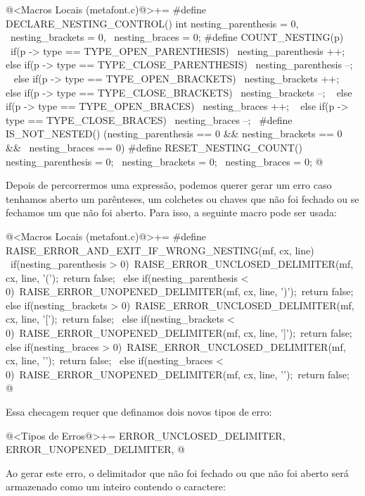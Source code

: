 \iniciocodigo
@<Macros Locais (metafont.c)@>+=
#define DECLARE_NESTING_CONTROL() int nesting_parenthesis = 0, \
                                      nesting_brackets = 0, \
                                      nesting_braces = 0;
#define COUNT_NESTING(p) \
  {if(p -> type == TYPE_OPEN_PARENTHESIS){         \
    nesting_parenthesis ++;                       \
  } else if(p -> type == TYPE_CLOSE_PARENTHESIS){ \
    nesting_parenthesis --;                       \
  } else if(p -> type == TYPE_OPEN_BRACKETS){     \
    nesting_brackets ++;                          \
  } else if(p -> type == TYPE_CLOSE_BRACKETS){    \
    nesting_brackets --;                          \
  } else if(p -> type == TYPE_OPEN_BRACES){       \
    nesting_braces ++;                            \
  } else if(p -> type == TYPE_CLOSE_BRACES){      \
    nesting_braces --;\
  }}
#define IS_NOT_NESTED() (nesting_parenthesis == 0 && nesting_brackets == 0 && \
                         nesting_braces == 0)
#define RESET_NESTING_COUNT() nesting_parenthesis = 0; \
                              nesting_brackets = 0; \
                              nesting_braces = 0;
@
\fimcodigo

Depois de percorrermos uma expressão, podemos querer gerar um erro
caso tenhamos aberto um parênteses, um colchetes ou chaves que não foi
fechado ou se fechamos um que não foi aberto. Para isso, a seguinte
macro pode ser usada:

\iniciocodigo
@<Macros Locais (metafont.c)@>+=
#define RAISE_ERROR_AND_EXIT_IF_WRONG_NESTING(mf, cx, line) {\
  if(nesting_parenthesis > 0){\
    RAISE_ERROR_UNCLOSED_DELIMITER(mf, cx, line, '(');\
    return false;\
  } else if(nesting_parenthesis < 0){\
    RAISE_ERROR_UNOPENED_DELIMITER(mf, cx, line, ')');\
    return false;\
  } else if(nesting_brackets > 0){\
    RAISE_ERROR_UNCLOSED_DELIMITER(mf, cx, line, '[');\
    return false;\
  } else if(nesting_brackets < 0){\
    RAISE_ERROR_UNOPENED_DELIMITER(mf, cx, line, ']');\
    return false;\
  } else if(nesting_braces > 0){\
    RAISE_ERROR_UNCLOSED_DELIMITER(mf, cx, line, '{');\
    return false;\
  } else if(nesting_braces < 0){\
    RAISE_ERROR_UNOPENED_DELIMITER(mf, cx, line, '}');\
    return false;}}
@
\fimcodigo

Essa checagem requer que definamos dois novos tipos de erro:

\iniciocodigo
@<Tipos de Erros@>+=
ERROR_UNCLOSED_DELIMITER, ERROR_UNOPENED_DELIMITER,
@
\fimcodigo

Ao gerar este erro, o delimitador que não foi fechado ou que não foi
aberto será armazenado como um inteiro contendo o caractere:

